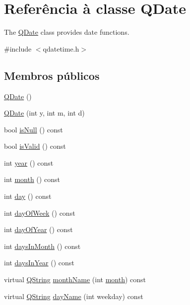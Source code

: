 \hypertarget{class_q_date}{\section{Referência à classe Q\-Date}
\label{class_q_date}
}


The \hyperlink{class_q_date}{Q\-Date} class provides date functions.  




{\ttfamily \#include $<$qdatetime.\-h$>$}

\subsection*{Membros públicos}
\begin{DoxyCompactItemize}
\item 
\hyperlink{class_q_date_ada3aa5e7f747e5f600162c8faab43845}{Q\-Date} ()
\item 
\hyperlink{class_q_date_a594b19bf0d8e9dd73358daebb81451e3}{Q\-Date} (int y, int m, int d)
\item 
bool \hyperlink{class_q_date_ac02f2a4d7312eb91f40980adfd4e31b2}{is\-Null} () const 
\item 
bool \hyperlink{class_q_date_aac1b70a2ed67ead038c4d3f5ac4d8a81}{is\-Valid} () const 
\item 
int \hyperlink{class_q_date_ab30e3b28d52eaa040cf319dd6dc1e540}{year} () const 
\item 
int \hyperlink{class_q_date_a355d09d181aac0740f52d4de32ecef28}{month} () const 
\item 
int \hyperlink{class_q_date_a8351735d17aade98a109869520db2654}{day} () const 
\item 
int \hyperlink{class_q_date_a56ec4f975c56ff04a7f82a3c8fd88c7d}{day\-Of\-Week} () const 
\item 
int \hyperlink{class_q_date_ac8fc8b70667e887946e43ac2b56c153f}{day\-Of\-Year} () const 
\item 
int \hyperlink{class_q_date_ab7ce9d9c27f9246725d8dc1241f52698}{days\-In\-Month} () const 
\item 
int \hyperlink{class_q_date_a114a4088c7d3e46a36a55cbfff4b54b7}{days\-In\-Year} () const 
\item 
virtual \hyperlink{class_q_string}{Q\-String} \hyperlink{class_q_date_a00c3489f166c84ce1961b77d8e8196a2}{month\-Name} (int \hyperlink{class_q_date_a355d09d181aac0740f52d4de32ecef28}{month}) const 
\item 
virtual \hyperlink{class_q_string}{Q\-String} \hyperlink{class_q_date_a573efd9ed94bc7a6f0a99dfa1f832ce1}{day\-Name} (int weekday) const 

\end{DoxyCompactItemize}
